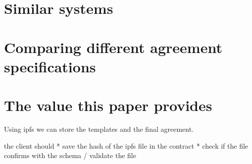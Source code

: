 \section{Similar systems}

\section{Comparing different agreement specifications}

\section{The value this paper provides}

Using ipfs \cite{ipfs} we can store the templates and the final agreement.

the client should
* save the hash of the ipfs file in the contract
* check if the file confirms with the schema / validate the file
